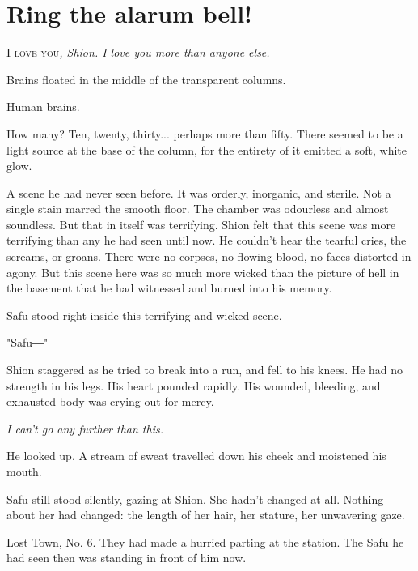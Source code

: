 
\chapter{Ring the alarum bell!}


\lettrine{I}{ love you}\emph{, Shion. I love you more than anyone else.}

\myspace

Brains floated in the middle of the transparent columns.

Human brains.

How many? Ten, twenty, thirty... perhaps more than fifty. There seemed
to be a light source at the base of the column, for the entirety of it
emitted a soft, white glow.

A scene he had never seen before. It was orderly, inorganic, and
sterile. Not a single stain marred the smooth floor. The chamber was
odourless and almost soundless. But that in itself was terrifying. Shion
felt that this scene was more terrifying than any he had seen until now.
He couldn't hear the tearful cries, the screams, or groans. There were
no corpses, no flowing blood, no faces distorted in agony. But this
scene here was so much more wicked than the picture of hell in the
basement that he had witnessed and burned into his memory.

Safu stood right inside this terrifying and wicked scene.

"Safu―"

Shion staggered as he tried to break into a run, and fell to his knees.
He had no strength in his legs. His heart pounded rapidly. His wounded,
bleeding, and exhausted body was crying out for mercy.

\emph{I can't go any further than this.}

He looked up. A stream of sweat travelled down his cheek and moistened
his mouth.

Safu still stood silently, gazing at Shion. She hadn't changed at all.
Nothing about her had changed: the length of her hair, her stature, her
unwavering gaze.

Lost Town, No. 6. They had made a hurried parting at the station. The
Safu he had seen then was standing in front of him now.

